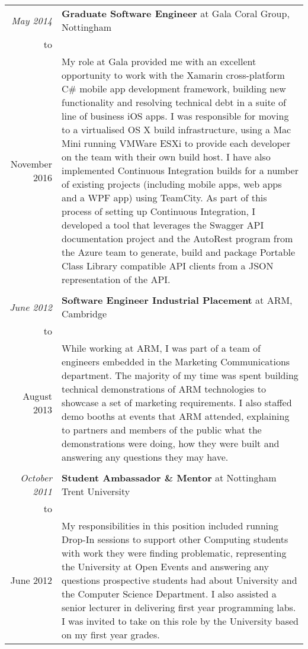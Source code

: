 \documentclass[a4paper,10pt]{article} %
\begin{document}
\begin{longtable}{r|p{16cm}}
\emph{May 2014} & \textbf{Graduate Software Engineer} at Gala Coral Group, Nottingham \\
to & \\
November 2016 & My role at Gala provided me with an excellent opportunity to work with the Xamarin cross-platform C\# mobile app development framework, building new functionality and resolving technical debt in a suite of line of business iOS apps. I was responsible for moving to a virtualised OS X build infrastructure, using a Mac Mini running VMWare ESXi to provide each developer on the team with their own build host. I have also implemented Continuous Integration builds for a number of existing projects (including mobile apps, web apps and a WPF app) using TeamCity. As part of
this process of setting up Continuous Integration, I developed a tool that leverages the Swagger API documentation project and the AutoRest program from the Azure team to generate, build and package Portable Class Library compatible API clients from a JSON representation of the API. \\
\multicolumn{2}{c}{} \\

\emph{June 2012} & \textbf{Software Engineer Industrial Placement} at ARM, Cambridge \\
to & \\
August 2013 & While working at ARM, I was part of a team of engineers embedded in the Marketing Communications department. The majority of my time was spent building technical demonstrations of ARM technologies to showcase a set of marketing requirements. I also staffed demo booths at events that ARM attended, explaining to partners and members of the public what the demonstrations were doing, how they were built and answering any questions they may have. \\
\multicolumn{2}{c}{} \\

\emph{October 2011} & \textbf{Student Ambassador \& Mentor} at Nottingham Trent University \\
to & \\
June 2012 & My responsibilities in this position included running Drop-In sessions to support other Computing students with work they were finding problematic, representing the University at Open Events and answering any questions prospective students had about University and the Computer Science Department. I also assisted a senior lecturer in delivering first year programming labs. I was invited to take on this role by the University based on my first year grades. \\

\end{longtable}
\pagebreak
\end{document}
